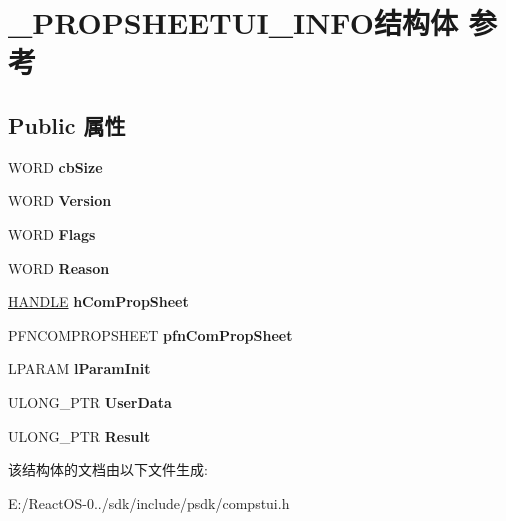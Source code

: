 \hypertarget{struct___p_r_o_p_s_h_e_e_t_u_i___i_n_f_o}{}\section{\+\_\+\+P\+R\+O\+P\+S\+H\+E\+E\+T\+U\+I\+\_\+\+I\+N\+F\+O结构体 参考}
\label{struct___p_r_o_p_s_h_e_e_t_u_i___i_n_f_o}
\subsection*{Public 属性}
\begin{DoxyCompactItemize}
\item 
\mbox{\label{struct___p_r_o_p_s_h_e_e_t_u_i___i_n_f_o_a865313d75d3a989706ef15edde70e653}} 
W\+O\+RD {\bfseries cb\+Size}
\item 
\mbox{\label{struct___p_r_o_p_s_h_e_e_t_u_i___i_n_f_o_a392e9fdd56f993b471c1ed111349c6c3}} 
W\+O\+RD {\bfseries Version}
\item 
\mbox{\label{struct___p_r_o_p_s_h_e_e_t_u_i___i_n_f_o_af3646be368b58c12c2c92da7b2fa09c9}} 
W\+O\+RD {\bfseries Flags}
\item 
\mbox{\label{struct___p_r_o_p_s_h_e_e_t_u_i___i_n_f_o_a012decb2165d9983c79593e1995a4764}} 
W\+O\+RD {\bfseries Reason}
\item 
\mbox{\label{struct___p_r_o_p_s_h_e_e_t_u_i___i_n_f_o_a0bea04a1798e0d05831a5905459a7de8}} 
\hyperlink{interfacevoid}{H\+A\+N\+D\+LE} {\bfseries h\+Com\+Prop\+Sheet}
\item 
\mbox{\label{struct___p_r_o_p_s_h_e_e_t_u_i___i_n_f_o_a61656826dd46594f285c5e9fba046889}} 
P\+F\+N\+C\+O\+M\+P\+R\+O\+P\+S\+H\+E\+ET {\bfseries pfn\+Com\+Prop\+Sheet}
\item 
\mbox{\label{struct___p_r_o_p_s_h_e_e_t_u_i___i_n_f_o_a698b3d842ef27d96a220a5fee18d41bf}} 
L\+P\+A\+R\+AM {\bfseries l\+Param\+Init}
\item 
\mbox{\label{struct___p_r_o_p_s_h_e_e_t_u_i___i_n_f_o_a61917ce92053b9484050bdcf9e22d59d}} 
U\+L\+O\+N\+G\+\_\+\+P\+TR {\bfseries User\+Data}
\item 
\mbox{\label{struct___p_r_o_p_s_h_e_e_t_u_i___i_n_f_o_abc700a0c1127bc1c36a26a218bf6d7ad}} 
U\+L\+O\+N\+G\+\_\+\+P\+TR {\bfseries Result}
\end{DoxyCompactItemize}


该结构体的文档由以下文件生成\+:\begin{DoxyCompactItemize}
\item 
E\+:/\+React\+O\+S-\/0../sdk/include/psdk/compstui.\+h\end{DoxyCompactItemize}
